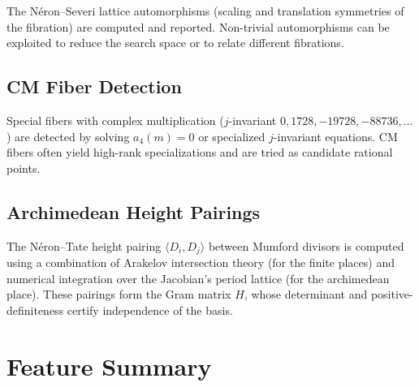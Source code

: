 \documentclass[11pt, a4paper]{article}
\begin{document}
The N\'eron--Severi lattice automorphisms (scaling and translation symmetries of the fibration) are computed and reported. Non-trivial automorphisms can be exploited to reduce the search space or to relate different fibrations.

\subsection{CM Fiber Detection}

Special fibers with complex multiplication ($j$-invariant $0, 1728, -19728, -88736, \dots$) are detected by solving $a_4(m) = 0$ or specialized $j$-invariant equations. CM fibers often yield high-rank specializations and are tried as candidate rational points.

\subsection{Archimedean Height Pairings}

The N\'eron--Tate height pairing $\langle D_i, D_j \rangle$ between Mumford divisors is computed using a combination of Arakelov intersection theory (for the finite places) and numerical integration over the Jacobian's period lattice (for the archimedean place). These pairings form the Gram matrix $H$, whose determinant and positive-definiteness certify independence of the basis.

\section{Feature Summary}
\end{document}
